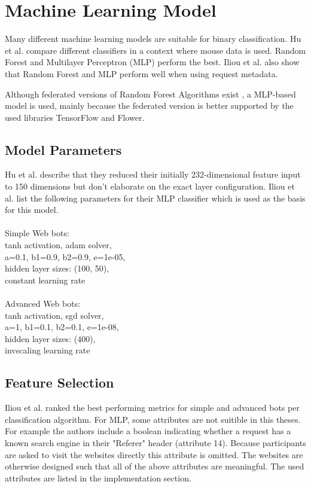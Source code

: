 \documentclass[
    fontsize=12pt,
    headings=small,
    parskip=half,           %
    bibliography=totoc,
    numbers=noenddot,       %
    open=any,               %
    final                   %
]{scrreprt}
\begin{document}
\section{Machine Learning Model}

Many different machine learning models are suitable for binary classification. Hu et al. \cite{8275816} compare different classifiers in a context where mouse data is used. Random Forest and Multilayer Perceptron (MLP) perform the best.
Iliou et al. \cite{10.1145/3339252.3339267} also show that Random Forest and MLP perform well when using request metadata.

Although federated versions of Random Forest Algorithms exist \cite{}, a MLP-based model is used, mainly because the federated version is better supported by the used libraries TensorFlow and Flower.

\subsection{Model Parameters}

Hu et al. \cite{8275816} describe that they reduced their initially 232-dimensional feature input to 150 dimensions but don't elaborate on the exact layer configuration. Iliou et al. \cite{10.1145/3339252.3339267} list the following parameters for their MLP classifier which is used as the basis for this model. \\
\\

Simple Web bots: \\
tanh activation, adam solver, \\
a=0.1, b1=0.9, b2=0.9, e=1e-05, \\
hidden layer sizes: (100, 50), \\
constant learning rate \\
\\
Advanced Web bots: \\
tanh activation, sgd solver, \\
a=1, b1=0.1, b2=0.1, e=1e-08, \\
hidden layer sizes: (400), \\
invscaling learning rate \\

\subsection{Feature Selection}

Iliou et al. \cite{10.1145/3339252.3339267} ranked the best performing metrics for simple and advanced bots per classification algorithm. For MLP, some attributes are not suitible in this theses. For example the authors include a boolean indicating whether a request has a known search engine in their "Referer" header (attribute 14). Because participants are asked to visit the websites directly this attribute is omitted. The websites are otherwise designed such that all of the above attributes are meaningful. The used attributes are listed in the implementation section.
\end{document}
